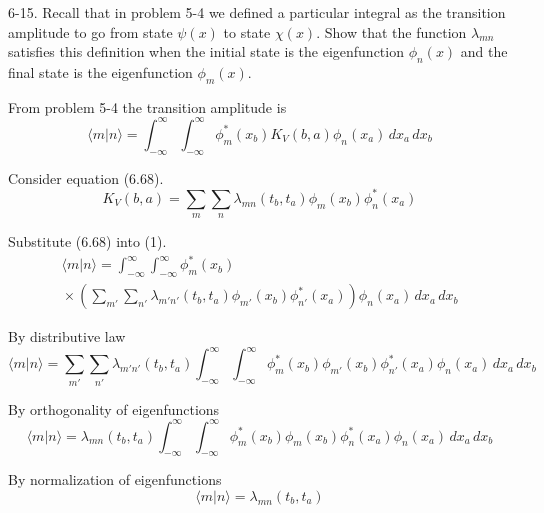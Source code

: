 \documentclass[12pt]{article}
\begin{document}
6-15.
Recall that in problem 5-4 we defined a particular integral as the
transition amplitude to go from state $\psi(x)$ to state $\chi(x)$.
Show that the function $\lambda_{mn}$ satisfies this definition
when the initial state is the eigenfunction $\phi_n(x)$ and the
final state is the eigenfunction $\phi_m(x)$.

\bigskip
From problem 5-4 the transition amplitude is
\begin{equation*}
\langle m|n\rangle=
\int_{-\infty}^\infty\int_{-\infty}^\infty
\phi_m^*(x_b)K_V(b,a)\phi_n(x_a)
\,dx_a\,dx_b
\tag{1}
\end{equation*}

Consider equation (6.68).
\begin{equation*}
K_V(b,a)=\sum_m\sum_n\lambda_{mn}(t_b,t_a)\phi_m(x_b)\phi_n^*(x_a)
\tag{6.68}
\end{equation*}

Substitute (6.68) into (1).
\begin{multline*}
\langle m|n\rangle=
\int_{-\infty}^\infty\int_{-\infty}^\infty
\phi_m^*(x_b)
\\
{}\times
\left(\sum_{m'}\sum_{n'}\lambda_{m'n'}(t_b,t_a)\phi_{m'}(x_b)\phi_{n'}^*(x_a)\right)
\phi_n(x_a)
\,dx_a\,dx_b
\end{multline*}

By distributive law
\begin{equation*}
\langle m|n\rangle=
\sum_{m'}\sum_{n'}\lambda_{m'n'}(t_b,t_a)
\int_{-\infty}^\infty\int_{-\infty}^\infty
\phi_m^*(x_b)\phi_{m'}(x_b)
\phi_{n'}^*(x_a)\phi_n(x_a)
\,dx_a\,dx_b
\end{equation*}

By orthogonality of eigenfunctions
\begin{equation*}
\langle m|n\rangle=
\lambda_{mn}(t_b,t_a)\int_{-\infty}^\infty\int_{-\infty}^\infty
\phi_m^*(x_b)\phi_m(x_b)
\phi_n^*(x_a)\phi_n(x_a)
\,dx_a\,dx_b
\end{equation*}

By normalization of eigenfunctions
\begin{equation*}
\langle m|n\rangle=
\lambda_{mn}(t_b,t_a)
\end{equation*}
\end{document}
